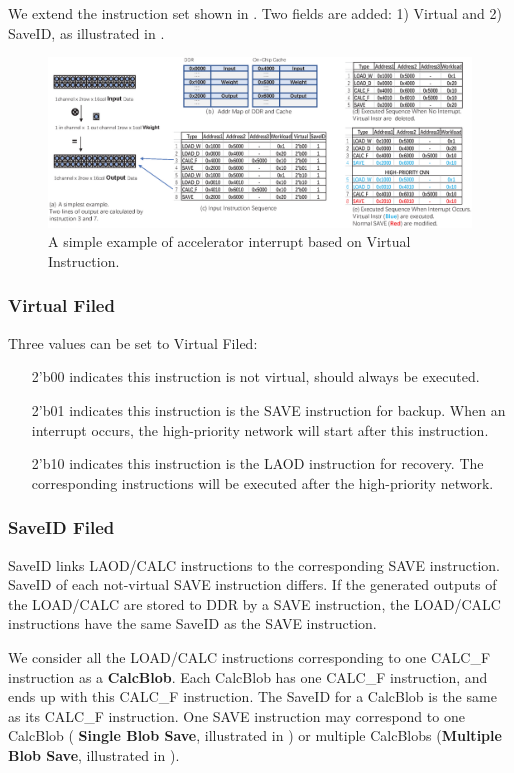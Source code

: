 We extend the instruction set shown in . Two fields are added: 1) Virtual and 2) SaveID, as illustrated in .

\begin{figure}[t]
	\centering
	\includegraphics[width=0.95\linewidth]{fig/interexample.eps}
	\caption{ A simple example of accelerator interrupt based on Virtual Instruction. }
	\label{fig:interexample}
\end{figure}

\subsubsection{ Virtual Filed}

Three values can be set to Virtual Filed:
\begin{itemize}
    \item[2'b00] indicates this instruction is not virtual, should always be executed.
    \item[2'b01] indicates this instruction is the SAVE instruction for backup. When an interrupt occurs, the high-priority network will start after this instruction.
    \item[2'b10] indicates this instruction is the LAOD instruction for recovery. The corresponding instructions will be executed after the high-priority network.
\end{itemize}

\subsubsection{ SaveID Filed }

SaveID links LAOD/CALC instructions to the corresponding SAVE instruction. SaveID of each not-virtual SAVE instruction differs. If the generated outputs of the LOAD/CALC are stored to DDR by a SAVE instruction, the LOAD/CALC instructions have the same SaveID as the SAVE instruction.

We consider all the LOAD/CALC instructions corresponding to one CALC\_F instruction as a \textbf{CalcBlob}. Each CalcBlob has one CALC\_F instruction, and ends up with this CALC\_F instruction. The SaveID for a CalcBlob is the same as its CALC\_F instruction.
One SAVE instruction may correspond to one CalcBlob ( \textbf{Single Blob Save}, illustrated in  ) or multiple CalcBlobs (\textbf{Multiple Blob Save}, illustrated in ).

